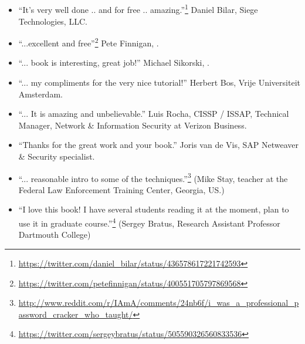 \subsection*{ \IT{\TITLE}}

\begin{itemize}
\item ``It's very well done .. and for free .. amazing.''\footnote{\url{https://twitter.com/daniel_bilar/status/436578617221742593}} Daniel Bilar, Siege Technologies, LLC.

\item ``...excellent and free''\footnote{\url{https://twitter.com/petefinnigan/status/400551705797869568}} Pete Finnigan, \oracle{}.

\item ``... book is interesting, great job!'' Michael Sikorski,  .

\item ``... my compliments for the very nice tutorial!'' Herbert Bos,  Vrije Universiteit Amsterdam.

\item ``... It is amazing and unbelievable.'' Luis Rocha, CISSP / ISSAP, Technical Manager, Network \& Information Security at Verizon Business.

\item ``Thanks for the great work and your book.'' Joris van de Vis, SAP Netweaver \& Security specialist.

\item ``... reasonable intro to some of the techniques.''\footnote{\url{http://www.reddit.com/r/IAmA/comments/24nb6f/i_was_a_professional_password_cracker_who_taught/}} (Mike Stay, teacher at the Federal Law Enforcement Training Center, Georgia, US.)

\item ``I love this book! I have several students reading it at the moment, plan to use it in graduate course.''\footnote{\url{https://twitter.com/sergeybratus/status/505590326560833536}} (Sergey Bratus, Research Assistant Professor   Dartmouth College)

\end{itemize}
